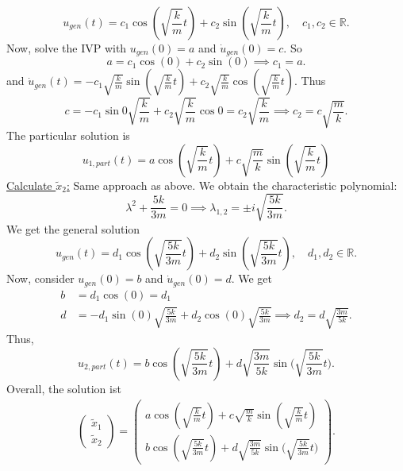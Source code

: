 \documentclass{article}
\theoremstyle{named}
\begin{document}
\begin{enumerate}[label=(\roman*)]
 	\[
 		u_{gen}(t) = c_1 \cos{(\sqrt{\frac{k}{m}}t)} + c_2 \sin{(\sqrt{\frac{k}{m}}t)}, \quad c_1, c_2 \in \mathbb R.
 	\]
 	Now, solve the IVP with $u_{gen}(0) = a$ and $\dot u_{gen}(0) = c$. So
 	\[
 		a = c_1 \cos(0) + c_2\sin(0) \implies c_1 = a.
 	\]
 	and $\dot u_{gen}(t) = -c_1\sqrt{\frac{k}{m}} \sin{(\sqrt{\frac{k}{m}}t)} + c_2\sqrt{\frac{k}{m}}\cos(\sqrt{\frac{k}{m}} t)$. Thus 
 	\[
 		c = -c_1 \sin0 \sqrt{\frac{k}{m}} + c_2\sqrt{\frac{k}{m}}\cos0 = c_2 \sqrt{\frac{k}{m}} \implies c_2 = c\sqrt{\frac{m}{k}}.
 	\]
 	The particular solution is
 	\[
 		u_{1,part}(t) = a  \cos{(\sqrt{\frac{k}{m}}t)} + c\sqrt{\frac{m}{k}} \sin{(\sqrt{\frac{k}{m}}t)}
 	\]
 	 \underline{Calculate $\tilde x_2$:} Same approach as above. We obtain the characteristic polynomial:
 	 \[
 	 	\lambda^2 + \frac{5k}{3m} = 0 \implies \lambda_{1,2} = \pm i \sqrt{\frac{5k}{3m}}.
 	 \]
 	 We get the general solution
 	 \[
 	 	u_{gen}(t) = d_1 \cos{(\sqrt{\frac{5k}{3m}}t)} + d_2 \sin{(\sqrt{\frac{5k}{3m}}t)}, \quad d_1, d_2 \in \mathbb R.
 	 \]
 	 Now, consider $u_{gen}(0) = b$ and $\dot u_{gen}(0) = d$. We get
 	 \begin{align*}
	 	 b &= d_1 \cos(0) = d_1 \\
	 	 d &= -d_1 \sin(0) \sqrt{\frac{5k}{3m}} + d_2 \cos(0) \sqrt{\frac{5k}{3m}} \implies d_2 = d\sqrt{\frac{3m}{5k}}.
 	 \end{align*}
 	 Thus,
 	 \[
 	 	 u_{2,part}(t) = b  \cos{(\sqrt{\frac{5k}{3m}}t)} + d\sqrt{\frac{3m}{5k}} \sin{(\sqrt{\frac{5k}{3m}}t}).
 	 \]
 	 Overall, the solution ist
 	 \begin{align}
	 	 \begin{pmatrix}
		 	 \tilde x_1 \\ \tilde x_2
	 	 \end{pmatrix} =\begin{pmatrix}
	 	 a  \cos{(\sqrt{\frac{k}{m}}t)} + c\sqrt{\frac{m}{k}} \sin{(\sqrt{\frac{k}{m}}t)} \\
	 	 b  \cos{(\sqrt{\frac{5k}{3m}}t)} + d\sqrt{\frac{3m}{5k}} \sin{(\sqrt{\frac{5k}{3m}}t})
	 	 \end{pmatrix}.
 	 \end{align}
 	 

\end{enumerate}
\end{document}
